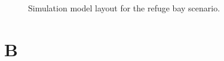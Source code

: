 \begin{appendices}
	\begin{figure}[h]
	\centering
	\caption{Simulation model layout for the refuge bay scenario.}
	\label{fig: Refuge bay layout}
\end{figure}	
\chapter{B}
\end{appendices}

